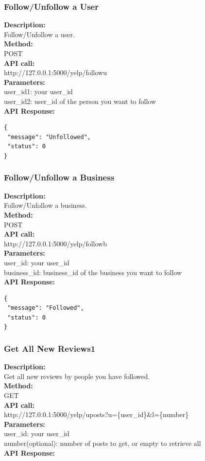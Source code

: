 \documentclass[12pt]{article}
\begin{document}
\subsubsection{Follow/Unfollow a User}
\textbf{Description:}\\
Follow/Unfollow a user.\\
\textbf{Method:}\\
POST\\
\textbf{API call:}\\
http://127.0.0.1:5000/yelp/followu\\
\textbf{Parameters:}\\
user\_id1: your user\_id\\
user\_id2: user\_id of the person you want to follow\\
\textbf{API Response:}

\begin{singlespacing}
\begin{lstlisting}
{
 "message": "Unfollowed",
 "status": 0
}
\end{lstlisting}
\end{singlespacing}

\subsubsection{Follow/Unfollow a Business}
\textbf{Description:}\\
Follow/Unfollow a business.\\
\textbf{Method:}\\
POST\\
\textbf{API call:}\\
http://127.0.0.1:5000/yelp/followb\\
\textbf{Parameters:}\\
user\_id: your user\_id\\
business\_id: business\_id of the business you want to follow\\
\textbf{API Response:}

\begin{singlespacing}
\begin{lstlisting}
{
 "message": "Followed",
 "status": 0
}
\end{lstlisting}
\end{singlespacing}

\subsubsection{Get All New Reviews1}
\textbf{Description:}\\
Get all new reviews by people you have followed.\\
\textbf{Method:}\\
GET\\
\textbf{API call:}\\ 
http://127.0.0.1:5000/yelp/uposts?u=\{user\_id\}\&l=\{number\}\\
\textbf{Parameters:}\\
user\_id: your user\_id\\
number(optional): number of posts to get, or empty to retrieve all\\
\textbf{API Response:}
\end{document}
